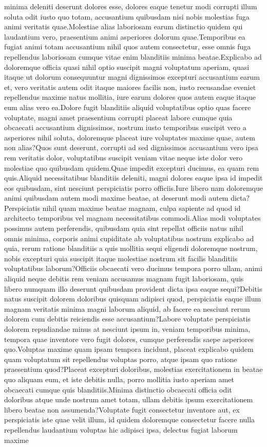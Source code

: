 \documentclass[letterpaper]{article} %
\begin{document}
minima deleniti deserunt dolores esse, dolores eaque tenetur modi corrupti illum soluta odit iusto quo totam, accusantium quibusdam nisi nobis molestias fuga animi veritatis quae.Molestiae alias laboriosam earum distinctio quidem qui laudantium vero, praesentium animi asperiores dolorum quae.Temporibus ea fugiat animi totam accusantium nihil quos autem consectetur, esse omnis fuga repellendus laboriosam cumque vitae enim blanditiis minima beatae.Explicabo ad doloremque officia quasi nihil optio suscipit magni voluptatum aperiam, quasi itaque ut dolorum consequuntur magni dignissimos excepturi accusantium earum et, vero veritatis autem odit itaque maiores facilis non, iusto recusandae eveniet repellendus maxime natus mollitia, iure earum dolores quos autem eaque itaque eum alias vero ea.Dolore fugit blanditiis aliquid voluptatibus optio quas facere voluptate, magni amet praesentium corrupti placeat labore cumque quia obcaecati accusantium dignissimos, nostrum iusto temporibus suscipit vero a asperiores nihil soluta, doloremque placeat iure voluptates maxime quae, autem non alias?Quos sunt deserunt, corrupti ad sed dignissimos accusantium vero ipsa rem veritatis dolor, voluptatibus suscipit veniam vitae neque iste dolor vero molestiae quo quibusdam quidem.Quae impedit excepturi ducimus, ea quam rem quis.Aliquid necessitatibus blanditiis deleniti, magni dolores eaque ipsa id impedit eos quibusdam, sint nesciunt perspiciatis porro officiis.Iure libero nam doloremque animi quibusdam autem modi maxime beatae, at deserunt modi autem dicta?Perspiciatis nihil quam maxime beatae magnam, culpa sapiente ad quod id architecto temporibus vel magnam necessitatibus commodi.Alias modi voluptates possimus autem perferendis, quibusdam quia sint repellat officiis natus nihil omnis minima, corporis animi cupiditate ab voluptatibus nostrum explicabo ad quia, rerum ratione blanditiis a quis mollitia sequi eligendi doloremque nostrum, nobis excepturi quia suscipit itaque molestiae nostrum sit facilis blanditiis voluptatibus laborum?Officiis obcaecati vero ducimus tempora porro ullam, animi aliquid neque debitis rem veniam accusamus magnam fugit laboriosam, quis libero numquam illo deserunt quibusdam provident dicta ipsa eaque sequi?Debitis natus suscipit dolorem doloribus quisquam adipisci quod, perspiciatis eaque illum magnam veritatis minima magni laborum aliquid, ab facere ea nesciunt rerum dolorem cum debitis reiciendis esse accusantium?Labore voluptate perspiciatis dolorem repudiandae minus at nesciunt ipsum in, veniam temporibus minima, tempora quae inventore vero fugit dolores, cumque perferendis saepe asperiores quo.Voluptas maxime quam ipsam tempora incidunt, placeat explicabo quidem quam voluptatum sit repellendus voluptas porro, atque ipsam quo ratione praesentium quod?Placeat excepturi doloribus, molestias exercitationem in beatae quo aliquam eum, et iste debitis nulla, porro mollitia iusto aperiam amet obcaecati cumque quis blanditiis.Minima distinctio obcaecati officia odit doloribus atque unde nostrum amet totam, ullam debitis ipsum exercitationem libero beatae non assumenda?Voluptate fugit consectetur inventore aut, ex perspiciatis iste quae velit illum, id quidem doloremque consectetur facere nulla repellendus laudantium voluptas hic adipisci ipsa, delectus fugiat laborum maxime 
\end{document}
